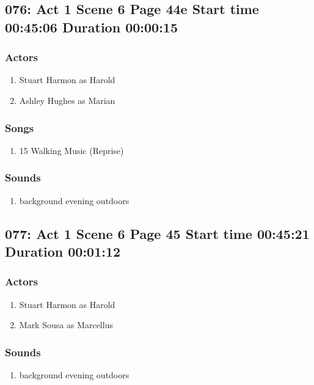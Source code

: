 \subsection{076: Act 1 Scene 6 Page 44e Start time 00:45:06 Duration 00:00:15}

\subsubsection{Actors}
\begin{enumerate}
\item Stuart Harmon as Harold
\item Ashley Hughes as Marian
\end{enumerate}

\subsubsection{Songs}
\begin{enumerate}
\item 15 Walking Music (Reprise)
\end{enumerate}\subsubsection{Sounds}
\begin{enumerate}
\item background evening outdoors
\end{enumerate}
\subsection{077: Act 1 Scene 6 Page 45 Start time 00:45:21 Duration 00:01:12}

\subsubsection{Actors}
\begin{enumerate}
\item Stuart Harmon as Harold
\item Mark Sousa as Marcellus
\end{enumerate}

\subsubsection{Sounds}
\begin{enumerate}
\item background evening outdoors
\end{enumerate}
